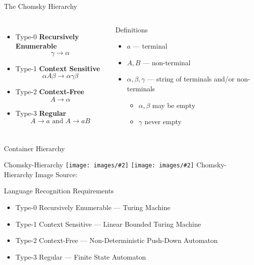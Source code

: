 \documentclass[]{beamer}
\makeatletter
\newcommand{\image}[3][\@nil]{%
        \def\tmp{#1}%
        \begin{center}
        \ifx\tmp\@nnil
            \texttt{[image: images/\#2]}
        \else
            \texttt{[image: images/\#2]}
            \linebreak
            #1
        \fi
        \linebreak
        {\tiny Image Source:\thinspace{\tiny #3}}
        \end{center}
}
\makeatother
\begin{document}
\begin{frame}{The Chomsky Hierarchy}
\begin{columns}
\begin{itemize}
    \item Type-0 {\bf Recursively Enumerable}
    \[
        \gamma \rightarrow \alpha
    \]
    \item Type-1 {\bf Context Sensitive}
    \[
    \alpha A \beta \rightarrow \alpha \gamma \beta
    \]
    \item Type-2 {\bf Context-Free}
    \[
    A \rightarrow \alpha
    \]
    \item Type-3 {\bf Regular}
    \[
    A \rightarrow a \textrm{ and }
    A \rightarrow aB
    \]
\end{itemize}
    \begin{block}{Definitions}
        \begin{itemize}
            \item $a$ --- terminal
            \item $A,B$ --- non-terminal
            \item $\alpha, \beta, \gamma$ --- string of terminals and/or non-terminals
            \begin{itemize}
                \item $\alpha,\beta$ may be empty
                \item $\gamma$ never empty
            \end{itemize}
        \end{itemize}
    \end{block}

\end{columns}
\end{frame}

\begin{frame}{Container Hierarchy}
\image[Chomsky-Hierarchy]{chomsky-hierarchy}{Wikipedia}
\end{frame}

\begin{frame}{Language Recognition Requirements}
    \begin{itemize}
        \item Type-0 Recursively Enumerable --- Turing Machine
        \item Type-1 Context Sensitive --- Linear Bounded Turing Machine
        \item Type-2 Context-Free --- Non-Deterministic Push-Down Automaton
        \item Type-3 Regular --- Finite State Automaton
    \end{itemize}
\end{frame}
\end{document}
